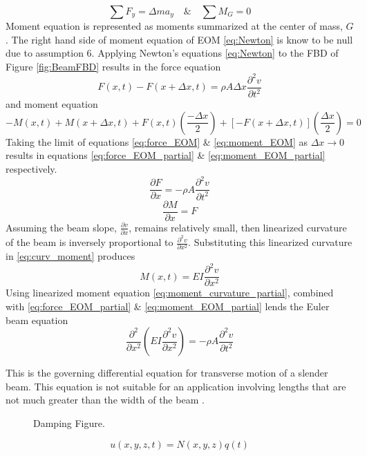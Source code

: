 \begin{equation} \label{eq:Newton}
\sum{F_y}=\Delta m a_y \quad \textrm{\&} \quad \sum{M_G}=0
\end{equation}
Moment equation is represented as moments summarized at the center of mass, $ G $. The right hand side of moment equation of EOM \eqref{eq:Newton} is know to be null due to assumption 6. Applying Newton's equations \eqref{eq:Newton} to the FBD of Figure \ref{fig:BeamFBD} results in the force equation
\begin{equation} \label{eq:force_EOM}
F(x,t)-F(x+\Delta x,t)=\rho A\Delta x \frac{\partial^2 v}{\partial t^2}
\end{equation}
and moment equation
\begin{equation} \label{eq:moment_EOM}
-M(x,t) + M(x+\Delta x,t) + F(x,t)\left( \frac{-\Delta x}{2}\right)  + \left[-F(x+\Delta x,t)\right] \left(\frac{\Delta x}{2}\right) = 0
\end{equation}
Taking the limit of equations \eqref{eq:force_EOM} \& \eqref{eq:moment_EOM} as $ \Delta x \rightarrow 0 $ results in equations \eqref{eq:force_EOM_partial} \& \eqref{eq:moment_EOM_partial} respectively.
\begin{equation} \label{eq:force_EOM_partial}
\frac{\partial F}{\partial x}=-\rho A \frac{\partial^2 v}{\partial t^2}
\end{equation} 
\begin{equation} \label{eq:moment_EOM_partial}
\frac{\partial M}{\partial x} = F
\end{equation}
Assuming the beam slope, $ \frac{\partial v}{\partial x} $, remains relatively small, then linearized curvature of the beam is inversely proportional to $ \frac{\partial^2 v}{\partial x^2} $. Substituting this linearized curvature in \eqref{eq:curv_moment} produces
\begin{equation} \label{eq:moment_curvature_partial}
M(x,t)=EI\frac{\partial^2 v}{\partial x^2}
\end{equation}
Using linearized moment equation \eqref{eq:moment_curvature_partial}, combined with \eqref{eq:force_EOM_partial} \&  \eqref{eq:moment_EOM_partial} lends the Euler beam equation
\begin{equation} \label{eq:euler_beam_equation}
\frac{\partial^2}{\partial x^2} \left(EI\frac{\partial^2 v}{\partial x^2}\right) = -\rho A\frac{\partial^2 v}{\partial t^2}
\end{equation}

This is the governing differential equation for transverse motion of a slender beam. This equation is not suitable for an application involving lengths that are not much greater than the width of the beam \cite{genta2007dynamics}.
\begin{figure}[h!]
	\centering
	
	\caption{Damping Figure.}
	\label{fig:Damp_Fig}
\end{figure}
\begin{equation} \label{eq:FEGoverning}
u(x,y,z,t)=N(x,y,z)q(t)
\end{equation}